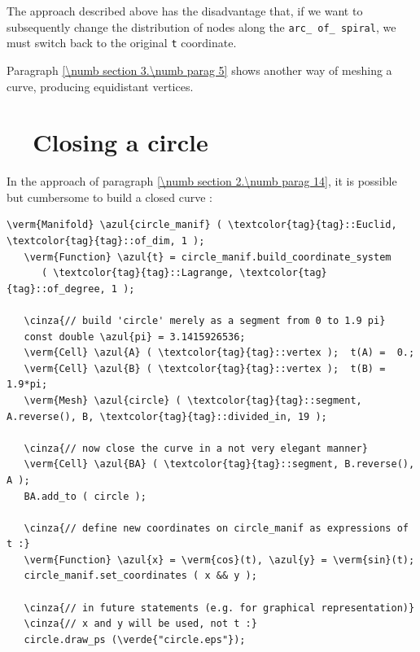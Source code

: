 The approach described above has the disadvantage that, if we want to subsequently change the
distribution of nodes along the {\small\tt arc\_\,of\_\,spiral}, we must switch back to the original
{\small\tt t} coordinate.

Paragraph \ref{\numb section 3.\numb parag 5} shows another way of meshing a curve,
producing equidistant vertices.


\section{~~Closing a circle}\label{\numb section 2.\numb parag 15}

In the approach of paragraph \ref{\numb section 2.\numb parag 14}, it is possible but cumbersome to
build a closed curve :

\begin{Verbatim}[commandchars=\\\{\},formatcom=\small\tt,frame=single,
   label=parag-\ref{\numb section 2.\numb parag 15}.cpp,rulecolor=\color{coment},
   baselinestretch=0.94,framesep=2mm]
   \verm{Manifold} \azul{circle_manif} ( \textcolor{tag}{tag}::Euclid, \textcolor{tag}{tag}::of_dim, 1 );
   \verm{Function} \azul{t} = circle_manif.build_coordinate_system
      ( \textcolor{tag}{tag}::Lagrange, \textcolor{tag}{tag}::of_degree, 1 );

   \cinza{// build 'circle' merely as a segment from 0 to 1.9 pi}
   const double \azul{pi} = 3.1415926536;
   \verm{Cell} \azul{A} ( \textcolor{tag}{tag}::vertex );  t(A) =  0.;
   \verm{Cell} \azul{B} ( \textcolor{tag}{tag}::vertex );  t(B) =  1.9*pi;
   \verm{Mesh} \azul{circle} ( \textcolor{tag}{tag}::segment, A.reverse(), B, \textcolor{tag}{tag}::divided_in, 19 );

   \cinza{// now close the curve in a not very elegant manner}
   \verm{Cell} \azul{BA} ( \textcolor{tag}{tag}::segment, B.reverse(), A );
   BA.add_to ( circle );

   \cinza{// define new coordinates on circle_manif as expressions of t :}
   \verm{Function} \azul{x} = \verm{cos}(t), \azul{y} = \verm{sin}(t);
   circle_manif.set_coordinates ( x && y );

   \cinza{// in future statements (e.g. for graphical representation)}
   \cinza{// x and y will be used, not t :}
   circle.draw_ps (\verde{"circle.eps"});
\end{Verbatim}


